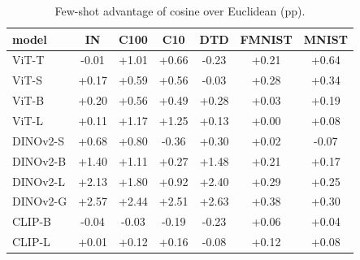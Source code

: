 \begin{table}[H]
\centering
\small
\begin{tabular}{lcccccc}
\toprule
model & IN & C100 & C10 & DTD & FMNIST & MNIST \\
\midrule
ViT-T & -0.01 & +1.01 & +0.66 & -0.23 & +0.21 & +0.64 \\
ViT-S & +0.17 & +0.59 & +0.56 & -0.03 & +0.28 & +0.34 \\
ViT-B & +0.20 & +0.56 & +0.49 & +0.28 & +0.03 & +0.19 \\
ViT-L & +0.11 & +1.17 & +1.25 & +0.13 & +0.00 & +0.08 \\
DINOv2-S & +0.68 & +0.80 & -0.36 & +0.30 & +0.02 & -0.07 \\
DINOv2-B & +1.40 & +1.11 & +0.27 & +1.48 & +0.21 & +0.17 \\
DINOv2-L & +2.13 & +1.80 & +0.92 & +2.40 & +0.29 & +0.25 \\
DINOv2-G & +2.57 & +2.44 & +2.51 & +2.63 & +0.38 & +0.30 \\
CLIP-B & -0.04 & -0.03 & -0.19 & -0.23 & +0.06 & +0.04 \\
CLIP-L & +0.01 & +0.12 & +0.16 & -0.08 & +0.12 & +0.08 \\
\bottomrule
\end{tabular}
\caption{Few-shot advantage of cosine over Euclidean (pp).}
\label{tab:a4}
\end{table}
